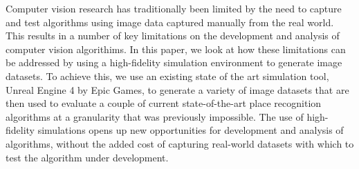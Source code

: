 
Computer vision research has traditionally been limited by the need to capture and test algorithms using image data captured manually from the real world.
This results in a number of key limitations on the development and analysis of computer vision algorithims.
In this paper, we look at how these limitations can be addressed by using a high-fidelity simulation environment to generate image datasets.
To achieve this, we use an existing state of the art simulation tool, Unreal Engine 4 by Epic Games, to generate a variety of image datasets that are then used to evaluate a couple of current state-of-the-art place recognition algorithms at a granularity that was previously impossible.
The use of high-fidelity simulations opens up new opportunities for development and analysis of algorithms, without the added cost of capturing real-world datasets with which to test the algorithm under development.